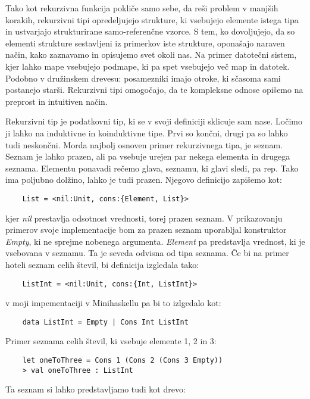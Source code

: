 \documentclass[12pt,a4paper,openany]{book}
\begin{document}
Tako kot rekurzivna funkcija pokliče samo sebe, da reši problem v manjših korakih, rekurzivni tipi opredeljujejo strukture, ki vsebujejo elemente istega tipa in ustvarjajo strukturirane 
samo-referenčne vzorce. S tem, ko dovoljujejo, da so elementi strukture sestavljeni iz primerkov iste strukture, oponašajo naraven način, kako zaznavamo in opisujemo svet okoli nas. 
Na primer datotečni sistem, kjer lahko mape vsebujejo podmape, ki pa spet vsebujejo več map in datotek. Podobno v družinskem drevesu: posamezniki imajo otroke, ki sčasoma sami 
postanejo starši. Rekurzivni tipi omogočajo, da te kompleksne odnose opišemo na preprost in intuitiven način.

Rekurzivni tip je podatkovni tip, ki se v svoji definiciji sklicuje sam nase. Ločimo ji lahko na induktivne in koinduktivne tipe. Prvi so končni, drugi pa so lahko tudi neskončni. 
Morda najbolj osnoven primer rekurzivnega tipa, je seznam. Seznam je lahko prazen, ali pa vsebuje urejen par nekega elementa in drugega seznama. Elementu ponavadi rečemo glava, seznamu, 
ki glavi sledi, pa rep. Tako ima poljubno dolžino, lahko je tudi prazen. Njegovo definicijo zapišemo kot:
\begin{lstlisting}
    List = <nil:Unit, cons:{Element, List}>
\end{lstlisting}
kjer \emph{nil} prestavlja odsotnost vrednosti, torej prazen seznam. V prikazovanju primerov svoje implementacije bom za prazen seznam uporabljal konstruktor \emph{Empty}, 
ki ne sprejme nobenega argumenta. \emph{Element} pa predstavlja vrednost, ki je vsebovana v seznamu. Ta je seveda odvisna od tipa seznama. Če bi na primer hoteli seznam celih števil, 
bi definicija izgledala tako:
\begin{lstlisting}
    ListInt = <nil:Unit, cons:{Int, ListInt}>
\end{lstlisting}
v moji impementaciji v Minihaskellu pa bi to izlgedalo kot:
\begin{lstlisting}
    data ListInt = Empty | Cons Int ListInt
\end{lstlisting}
Primer seznama celih števil, ki vsebuje elemente 1, 2 in 3:
\begin{lstlisting}
    let oneToThree = Cons 1 (Cons 2 (Cons 3 Empty))
    > val oneToThree : ListInt
\end{lstlisting}

Ta seznam si lahko predstavljamo tudi kot drevo:

\begin{center}
\end{center}
\end{document}
